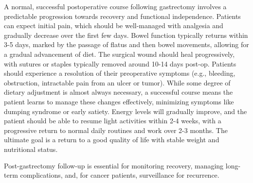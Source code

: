 A normal, successful postoperative course following gastrectomy involves a predictable progression towards recovery and functional independence. Patients can expect initial pain, which should be well-managed with analgesia and gradually decrease over the first few days. Bowel function typically returns within 3-5 days, marked by the passage of flatus and then bowel movements, allowing for a gradual advancement of diet. The surgical wound should heal progressively, with sutures or staples typically removed around 10-14 days post-op. Patients should experience a resolution of their preoperative symptoms (e.g., bleeding, obstruction, intractable pain from an ulcer or tumor). While some degree of dietary adjustment is almost always necessary, a successful course means the patient learns to manage these changes effectively, minimizing symptoms like dumping syndrome or early satiety. Energy levels will gradually improve, and the patient should be able to resume light activities within 2-4 weeks, with a progressive return to normal daily routines and work over 2-3 months. The ultimate goal is a return to a good quality of life with stable weight and nutritional status.

Post-gastrectomy follow-up is essential for monitoring recovery, managing long-term complications, and, for cancer patients, surveillance for recurrence.


